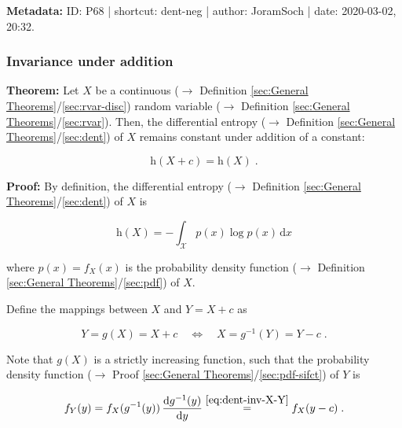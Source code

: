 \documentclass[a4paper,12pt,twoside]{book}
\begin{document}
\vspace{1em}
\textbf{Metadata:} ID: P68 | shortcut: dent-neg | author: JoramSoch | date: 2020-03-02, 20:32.
\vspace{1em}



\subsubsection[\textbf{Invariance under addition}]{Invariance under addition} \label{sec:dent-inv}
\setcounter{equation}{0}

\textbf{Theorem:} Let $X$ be a continuous ($\rightarrow$ Definition \ref{sec:General Theorems}/\ref{sec:rvar-disc}) random variable ($\rightarrow$ Definition \ref{sec:General Theorems}/\ref{sec:rvar}). Then, the differential entropy ($\rightarrow$ Definition \ref{sec:General Theorems}/\ref{sec:dent}) of $X$ remains constant under addition of a constant:

\begin{equation} \label{eq:dent-inv-dent-inv}
\mathrm{h}(X + c) = \mathrm{h}(X) \; .
\end{equation}


\vspace{1em}
\textbf{Proof:} By definition, the differential entropy ($\rightarrow$ Definition \ref{sec:General Theorems}/\ref{sec:dent}) of $X$ is

\begin{equation} \label{eq:dent-inv-X-dent}
\mathrm{h}(X) = - \int_{\mathcal{X}} p(x) \log p(x) \, \mathrm{d}x
\end{equation}

where $p(x) = f_X(x)$ is the probability density function ($\rightarrow$ Definition \ref{sec:General Theorems}/\ref{sec:pdf}) of $X$.

Define the mappings between $X$ and $Y = X + c$ as

\begin{equation} \label{eq:dent-inv-X-Y}
Y = g(X) = X + c \quad \Leftrightarrow \quad X = g^{-1}(Y) = Y - c \; .
\end{equation}

Note that $g(X)$ is a strictly increasing function, such that the probability density function ($\rightarrow$ Proof \ref{sec:General Theorems}/\ref{sec:pdf-sifct}) of $Y$ is

\begin{equation} \label{eq:dent-inv-Y-pdf}
f_Y(y) = f_X(g^{-1}(y)) \, \frac{\mathrm{d}g^{-1}(y)}{\mathrm{d}y} \overset{\eqref{eq:dent-inv-X-Y}}{=} f_X(y-c) \; .
\end{equation}
\end{document}
